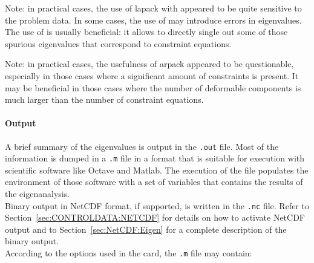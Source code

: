 Note: in practical cases, the use of lapack with 
appeared to be quite sensitive to the problem data.
In some cases, the use of  may introduce errors
in eigenvalues.
The use of  is usually beneficial: it allows to directly
single out some of those spurious eigenvalues that correspond
to constraint equations.

Note: in practical cases, the usefulness of arpack appeared
to be questionable, especially in those cases where a significant amount
of constraints is present.
It may be beneficial in those cases where the number of deformable components
is much larger than the number of constraint equations.

\paragraph{Output}
A brief summary of the eigenvalues is output in the \texttt{.out} file.
Most of the information is dumped in a \texttt{.m} file in a format
that is suitable for execution with scientific software like
Octave and Matlab. The execution of the file populates the environment 
of those software with a set of variables that contains the results 
of the eigenanalysis. \\ 
Binary output in NetCDF format, if supported, is written in the 
\texttt{.nc} file. Refer to Section~\ref{sec:CONTROLDATA:NETCDF} 
for details on how to activate NetCDF output and to 
Section~\ref{sec:NetCDF:Eigen} for a complete description of the 
binary output. \\
According to the options used in the 
 card,
the \texttt{.m} file may contain:
